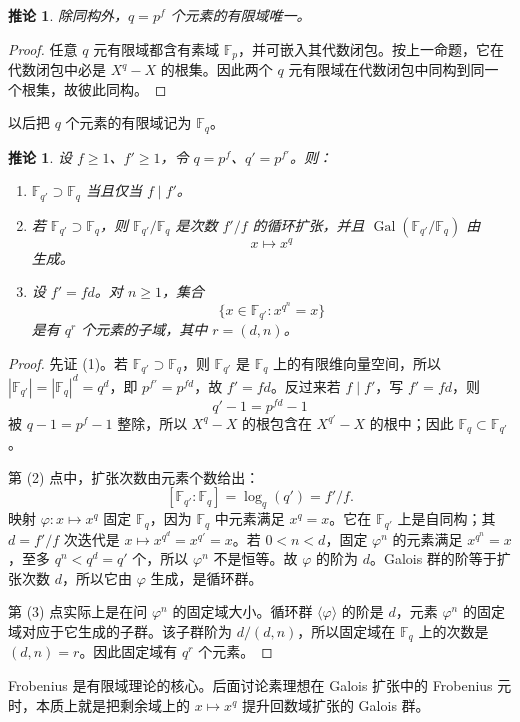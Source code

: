 \documentclass[11pt,a4paper,openany]{ctexbook}
\numberwithin{equation}{chapter}
\newcommand{\F}{\mathbb{F}}
\newcommand{\Gal}{\operatorname{Gal}}
\theoremstyle{plain}
\newtheorem{corollary}[theorem]{推论}
\theoremstyle{definition}
\theoremstyle{remark}
\begin{document}
\begin{corollary}
除同构外，$q=p^f$ 个元素的有限域唯一。
\end{corollary}

\begin{proof}
任意 $q$ 元有限域都含有素域 $\F_p$，并可嵌入其代数闭包。按上一命题，它在代数闭包中必是 $X^q-X$ 的根集。因此两个 $q$ 元有限域在代数闭包中同构到同一个根集，故彼此同构。
\end{proof}

以后把 $q$ 个元素的有限域记为 $\F_q$。

\begin{corollary}
设 $f\ge1$、$f'\ge1$，令 $q=p^f$、$q'=p^{f'}$。则：
\begin{enumerate}[label=(\arabic*)]
\item $\F_{q'}\supset \F_q$ 当且仅当 $f\mid f'$。
\item 若 $\F_{q'}\supset\F_q$，则 $\F_{q'}/\F_q$ 是次数 $f'/f$ 的循环扩张，并且 $\Gal(\F_{q'}/\F_q)$ 由
\[
x\longmapsto x^q
\]
生成。
\item 设 $f'=fd$。对 $n\ge1$，集合
\[
\{x\in\F_{q'}:x^{q^n}=x\}
\]
是有 $q^r$ 个元素的子域，其中 $r=(d,n)$。
\end{enumerate}
\end{corollary}

\begin{proof}
先证 (1)。若 $\F_{q'}\supset \F_q$，则 $\F_{q'}$ 是 $\F_q$ 上的有限维向量空间，所以 $|\F_{q'}|=|\F_q|^d=q^d$，即 $p^{f'}=p^{fd}$，故 $f'=fd$。反过来若 $f\mid f'$，写 $f'=fd$，则
\[
q'-1=p^{fd}-1
\]
被 $q-1=p^f-1$ 整除，所以 $X^q-X$ 的根包含在 $X^{q'}-X$ 的根中；因此 $\F_q\subset\F_{q'}$。

第 (2) 点中，扩张次数由元素个数给出：
\[
[\F_{q'}:\F_q]=\log_q(q')=f'/f.
\]
映射 $\varphi:x\mapsto x^q$ 固定 $\F_q$，因为 $\F_q$ 中元素满足 $x^q=x$。它在 $\F_{q'}$ 上是自同构；其 $d=f'/f$ 次迭代是 $x\mapsto x^{q^d}=x^{q'}=x$。若 $0<n<d$，固定 $\varphi^n$ 的元素满足 $x^{q^n}=x$，至多 $q^n<q^d=q'$ 个，所以 $\varphi^n$ 不是恒等。故 $\varphi$ 的阶为 $d$。Galois 群的阶等于扩张次数 $d$，所以它由 $\varphi$ 生成，是循环群。

第 (3) 点实际上是在问 $\varphi^n$ 的固定域大小。循环群 $\langle\varphi\rangle$ 的阶是 $d$，元素 $\varphi^n$ 的固定域对应于它生成的子群。该子群阶为 $d/(d,n)$，所以固定域在 $\F_q$ 上的次数是 $(d,n)=r$。因此固定域有 $q^r$ 个元素。
\end{proof}

Frobenius 是有限域理论的核心。后面讨论素理想在 Galois 扩张中的 Frobenius 元时，本质上就是把剩余域上的 $x\mapsto x^q$ 提升回数域扩张的 Galois 群。
\end{document}
